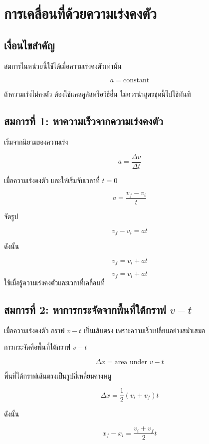 \documentclass[12pt,a4paper]{report}
\begin{document}
\section{การเคลื่อนที่ด้วยความเร่งคงตัว}

\subsection{เงื่อนไขสำคัญ}

สมการในหน่วยนี้ใช้ได้เมื่อความเร่งคงตัวเท่านั้น

\[
a=\text{constant}
\]

ถ้าความเร่งไม่คงตัว ต้องใช้แคลคูลัสหรือวิธีอื่น ไม่ควรนำสูตรชุดนี้ไปใช้ทันที

\subsection{สมการที่ 1: หาความเร็วจากความเร่งคงตัว}

เริ่มจากนิยามของความเร่ง

\[
a=\frac{\Delta v}{\Delta t}
\]

เมื่อความเร่งคงตัว และให้เริ่มจับเวลาที่ $t=0$

\[
a=\frac{v_f-v_i}{t}
\]

จัดรูป

\[
v_f-v_i=at
\]

ดังนั้น

\[
v_f=v_i+at
\]

\begin{tcolorbox}[title=สมการที่ 1]
\[
v_f=v_i+at
\]
ใช้เมื่อรู้ความเร่งคงตัวและเวลาที่เคลื่อนที่
\end{tcolorbox}

\subsection{สมการที่ 2: หาการกระจัดจากพื้นที่ใต้กราฟ $v-t$}

เมื่อความเร่งคงตัว กราฟ $v-t$ เป็นเส้นตรง เพราะความเร็วเปลี่ยนอย่างสม่ำเสมอ

การกระจัดคือพื้นที่ใต้กราฟ $v-t$

\[
\Delta x=\text{area under }v-t
\]

พื้นที่ใต้กราฟเส้นตรงเป็นรูปสี่เหลี่ยมคางหมู

\[
\Delta x=\frac{1}{2}(v_i+v_f)t
\]

ดังนั้น

\[
x_f-x_i=\frac{v_i+v_f}{2}t
\]
\end{document}
